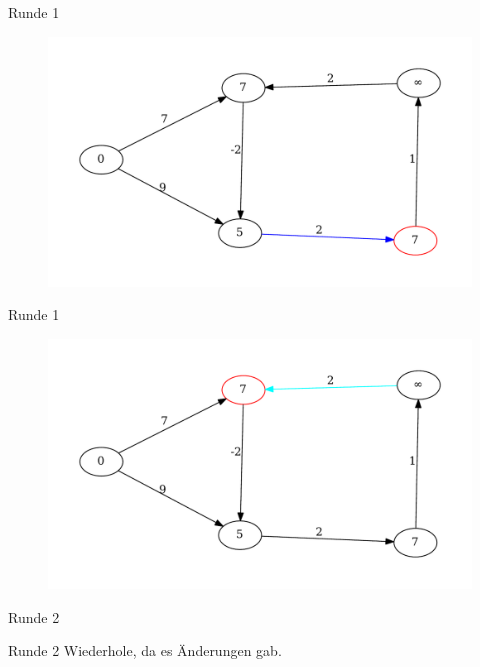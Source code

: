 \begin{frame}{Runde 1}
\begin{figure}[htbp]
\centering
\includegraphics[width=\linewidth]{bellman_ford_graphs/graph_05.pdf}
\end{figure}
\end{frame}

\begin{frame}{Runde 1}
\begin{figure}[htbp]
\centering
\includegraphics[width=\linewidth]{bellman_ford_graphs/graph_06.pdf}
\end{figure}
\end{frame}

\begin{frame}{Runde 2}
	\begin{block}{Runde 2}
	Wiederhole, da es Änderungen gab.
	\end{block}
\end{frame}

